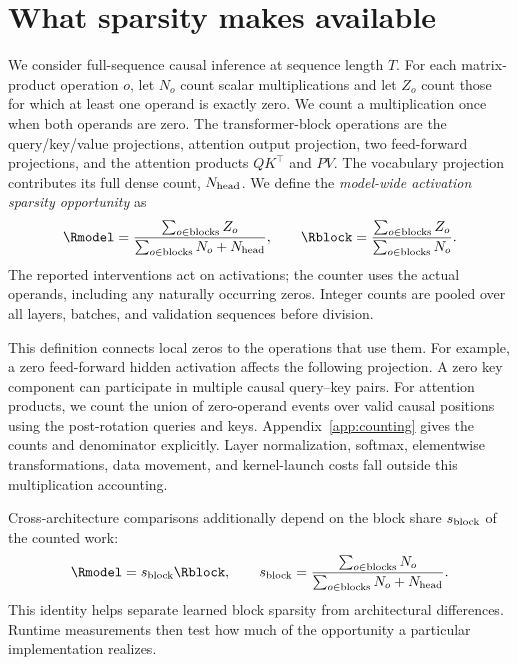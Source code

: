 \section{What sparsity makes available}
\label{sec:measurement}
We consider full-sequence causal inference at sequence length $T$. For each
matrix-product operation $o$, let $N_o$ count scalar multiplications and let
$Z_o$ count those for which at least one operand is exactly zero. We count a
multiplication once when both operands are zero. The transformer-block
operations are the query/key/value projections, attention output projection,
two feed-forward projections, and the attention products $QK^\top$ and $PV$.
The vocabulary projection contributes its full dense count, $N_{\rm head}$.
We define the \emph{model-wide activation sparsity opportunity} as
\begin{equation}
 \Rmodel =
 \frac{\sum_{o\in{\rm blocks}} Z_o}
      {\sum_{o\in{\rm blocks}} N_o+N_{\rm head}},
 \qquad
 \Rblock =
 \frac{\sum_{o\in{\rm blocks}} Z_o}{\sum_{o\in{\rm blocks}} N_o}.
 \label{eq:opportunity}
\end{equation}
The reported interventions act on activations; the counter uses the actual
operands, including any naturally occurring zeros. Integer counts are pooled
over all layers, batches, and validation sequences before division.

This definition connects local zeros to the operations that use them.
For example, a zero feed-forward hidden activation affects the following
projection. A zero key component can participate in multiple causal
query--key pairs. For attention products, we count the union of zero-operand
events over valid causal positions using the post-rotation queries and keys.
Appendix~\ref{app:counting} gives the counts and denominator explicitly.
Layer normalization, softmax, elementwise transformations, data movement, and
kernel-launch costs fall outside this multiplication accounting.

Cross-architecture comparisons additionally depend on the block share
$s_{\rm block}$ of the counted work:
\begin{equation}
  \Rmodel = s_{\rm block}\Rblock,\qquad
  s_{\rm block}=\frac{\sum_{o\in{\rm blocks}}N_o}
  {\sum_{o\in{\rm blocks}}N_o+N_{\rm head}}.
  \label{eq:block-share}
\end{equation}
This identity helps separate learned block sparsity from architectural
differences. Runtime measurements then test how much of the opportunity a
particular implementation realizes.
